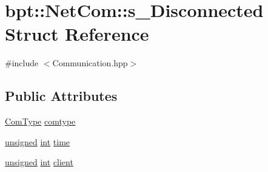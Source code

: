 \hypertarget{structbpt_1_1_net_com_1_1s___disconnected}{\section{bpt\-:\-:Net\-Com\-:\-:s\-\_\-\-Disconnected Struct Reference}
\label{structbpt_1_1_net_com_1_1s___disconnected}
}


{\ttfamily \#include $<$Communication.\-hpp$>$}

\subsection*{Public Attributes}
\begin{DoxyCompactItemize}
\item 
\hyperlink{namespacebpt_1_1_net_com_a73b47b2b099bf7d28997dc72c921212c}{Com\-Type} \hyperlink{structbpt_1_1_net_com_1_1s___disconnected_ab5e8c45cb8f6efc24653fe5ccd1cee0d}{comtype}
\item 
\hyperlink{curses_8priv_8h_aca40206900cfc164654362fa8d4ad1e6}{unsigned} \hyperlink{term__entry_8h_ad65b480f8c8270356b45a9890f6499ae}{int} \hyperlink{structbpt_1_1_net_com_1_1s___disconnected_add20b8bfdd135d31b868ff99351a3816}{time}
\item 
\hyperlink{curses_8priv_8h_aca40206900cfc164654362fa8d4ad1e6}{unsigned} \hyperlink{term__entry_8h_ad65b480f8c8270356b45a9890f6499ae}{int} \hyperlink{structbpt_1_1_net_com_1_1s___disconnected_a38c6c2c5802d5125b6d83f193fdf676e}{client}
\end{DoxyCompactItemize}


